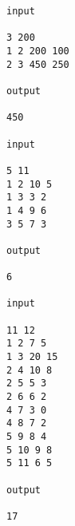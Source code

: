 \begin{verbatim}
input 
 
3 200 
1 2 200 100 
2 3 450 250 
 
output 
 
450

input 
 
5 11 
1 2 10 5 
1 3 3 2 
1 4 9 6 
3 5 7 3 
 
output 
 
6

input 
 
11 12 
1 2 7 5 
1 3 20 15 
2 4 10 8 
2 5 5 3 
2 6 6 2 
4 7 3 0 
4 8 7 2 
5 9 8 4 
5 10 9 8 
5 11 6 5 
 
output 
 
17\end{verbatim}